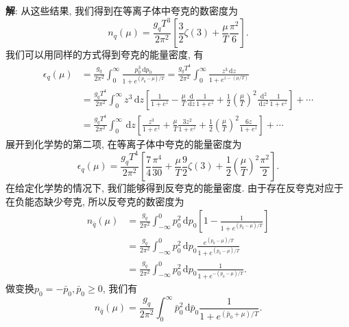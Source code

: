\documentclass{ctexart}
\newenvironment{answer}{\textbf{解}:}{
\vspace{0.5cm}
}
\newcommand\diff{\,\mathrm{d}}
\begin{document}
\begin{answer}
从这些结果, 我们得到在等离子体中夸克的数密度为
\begin{equation}\label{eq5}
  n_q(\mu) = \frac{g_qT^3}{2\pi^2} \left[ \frac{3}{2} \zeta(3) + \frac{\mu}{T} \frac{\pi^2}{6} \right].
\end{equation}
我们可以用同样的方式得到夸克的能量密度, 有
\begin{equation}
  \begin{split}
    \epsilon_q(\mu) &= \frac{g_q}{2\pi^2} \int_0^\infty \frac{p_0^3 \diff p_0}{1+e^{(p_0 - \mu)/T}} = \frac{g_qT^4}{2\pi^2} \int_0^\infty \frac{z^3\diff z}{1+e^{z-(\mu/T)}} \\
    &= \frac{g_qT^4}{2\pi^2} \int_0^\infty z^3 \diff z \left[ \frac{1}{1+e^z} - \frac{\mu}{T} \frac{\diff }{\diff z} \frac{1}{1+e^z} + \frac{1}{2}\left(\frac{\mu}{T}\right)^2 \frac{\diff^2}{\diff z^2} \frac{1}{1 + e^z} \right] + \cdots \\
    &= \frac{g_qT^4}{2\pi^2} \int_0^\infty \diff z \left[ \frac{z^3}{1+e^z} + \frac{\mu}{T} \frac{3z^2}{1+e^z} + \frac{1}{2}\left(\frac{\mu}{T}\right)^2 \frac{6z}{1+e^z} \right] + \cdots
  \end{split}
\end{equation}
展开到化学势的第二项, 在等离子体中夸克的能量密度为
\begin{equation}\label{eq6}
  \epsilon_q(\mu) = \frac{g_q T^4}{2\pi^2} \left[ \frac{7}{4} \frac{\pi^4}{30} + \frac{\mu}{T} \frac{9}{2} \zeta(3) + \frac{1}{2} \left( \frac{\mu}{T} \right)^2 \frac{\pi^2}{2} \right].
\end{equation}
在给定化学势的情况下, 我们能够得到反夸克的能量密度. 由于存在反夸克对应于在负能态缺少夸克, 所以反夸克的数密度为
\begin{equation}
  \begin{split}
    n_{\bar{q}}(\mu) &= \frac{g_q}{2\pi^2} \int_{-\infty}^0 p_0^2 \diff p_0 \left[ 1 - \frac{1}{1 + e^{(p_0-\mu)/T}} \right] \\
    &= \frac{g_q}{2\pi^2} \int_{-\infty}^0 p_0^2 \diff p_0 \frac{e^{(p_0-\mu)/T}}{1+e^{(p_0-\mu)/T}} \\
    &= \frac{g_q}{2\pi^2} \int_{-\infty}^0 p_0^2 \diff p_0 \frac{1}{1 + e^{-(p_0-\mu)/T}}.
  \end{split}
\end{equation}
做变换$p_0 = -\bar{p}_0, \bar{p}_0 \geq 0$, 我们有
\begin{equation}\label{eq7}
  n_{\bar{q}}(\mu) = \frac{g_q}{2\pi^2} \int_0^\infty \bar{p}_0^2 \diff \bar{p}_0 \frac{1}{1 + e^{(\bar{p}_0+\mu)/T}}.
\end{equation}

\end{answer}
\end{document}
